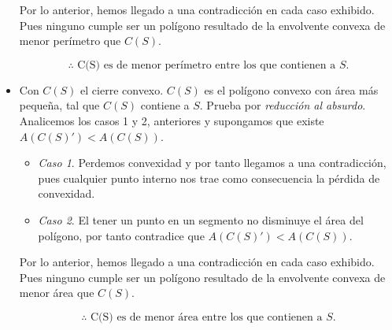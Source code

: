 \begin{itemize}
  Por lo anterior, hemos llegado a una contradicción en cada caso exhibido. Pues
  ninguno cumple ser un polígono resultado de la envolvente convexa de menor perímetro
  que $C(S)$.

  \[\therefore \text{ C(S) es de menor perímetro entre los que contienen a $S$.}\]
\item Con $C(S)$ el cierre convexo. $C(S)$ es el polígono convexo con área más pequeña, tal que
  $C(S)$ contiene a $S$.
  \newline
  Prueba por \textit{reducción al absurdo}. Analicemos los casos 1 y 2, anteriores y supongamos que
  existe $A(C(S)') < A(C(S))$.
  \begin{itemize}
  \item \textit{Caso 1}. Perdemos convexidad y por tanto llegamos a una contradicción, pues cualquier
    punto interno nos trae como consecuencia la pérdida de convexidad.
  \item \textit{Caso 2}. El tener un punto en un segmento no disminuye el área del polígono, por tanto
    contradice que $A(C(S)') < A(C(S))$.
  \end{itemize}
  Por lo anterior, hemos llegado a una contradicción en cada caso exhibido. Pues
  ninguno cumple ser un polígono resultado de la envolvente convexa de menor área
  que $C(S)$.

  \[\therefore \text{ C(S) es de menor área entre los que contienen a $S$.}\]
\end{itemize}
